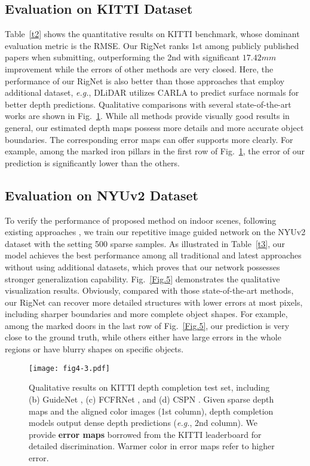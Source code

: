 \documentclass[runningheads]{llncs}
\begin{document}
\subsection{Evaluation on KITTI Dataset}
Table~\ref{t2} shows the quantitative results on KITTI benchmark, whose dominant evaluation metric is the RMSE. Our RigNet ranks 1st among publicly published papers when submitting, outperforming the 2nd with significant $17.42mm$ improvement while the errors of other methods are very closed. Here, the performance of our RigNet is also better than those approaches that employ additional dataset, \emph{e.g.}, DLiDAR \cite{Qiu_2019_CVPR} utilizes CARLA \cite{dosovitskiy2017carla} to predict surface normals for better depth predictions. Qualitative comparisons with several state-of-the-art works are shown in Fig.~\ref{Fig.4}. While all methods provide visually good results in general, our estimated depth maps possess more details and more accurate object boundaries. The corresponding error maps can offer supports more clearly. For example, among the marked iron pillars in the first row of Fig.~\ref{Fig.4}, the error of our prediction is significantly lower than the others.

\subsection{Evaluation on NYUv2 Dataset}
To verify the performance of proposed method on indoor scenes, following existing approaches \cite{Cheng2020CSPN,park2020nonlocal,tang2020learning,liu2021fcfr}, we train our repetitive image guided network on the NYUv2 dataset \cite{silberman2012indoor} with the setting 500 sparse samples. As illustrated in Table~\ref{t3}, our model achieves the best performance among all traditional and latest approaches without using additional datasets, which proves that our network possesses stronger generalization capability. Fig.~\ref{Fig.5} demonstrates the qualitative visualization results. Obviously, compared with those state-of-the-art methods, our RigNet can recover more detailed structures with lower errors at most pixels, including sharper boundaries and more complete object shapes. For example, among the marked doors in the last row of Fig.~\ref{Fig.5}, our prediction is very close to the ground truth, while others either have large errors in the whole regions or have blurry shapes on specific objects.

\begin{figure}[t]
  \centering
  \texttt{[image: fig4-3.pdf]}\\
  \caption{Qualitative results on KITTI depth completion test set, including (b) GuideNet \cite{tang2020learning}, (c) FCFRNet \cite{liu2021fcfr}, and (d) CSPN \cite{2018Learning}. Given sparse depth maps and the aligned color images (1st column), depth completion models output dense depth predictions (\emph{e.g.}, 2nd column). We provide \textbf{error maps} borrowed from the KITTI leaderboard for detailed discrimination. Warmer color in error maps refer to higher error.}\label{Fig.4}
\end{figure}
\end{document}
